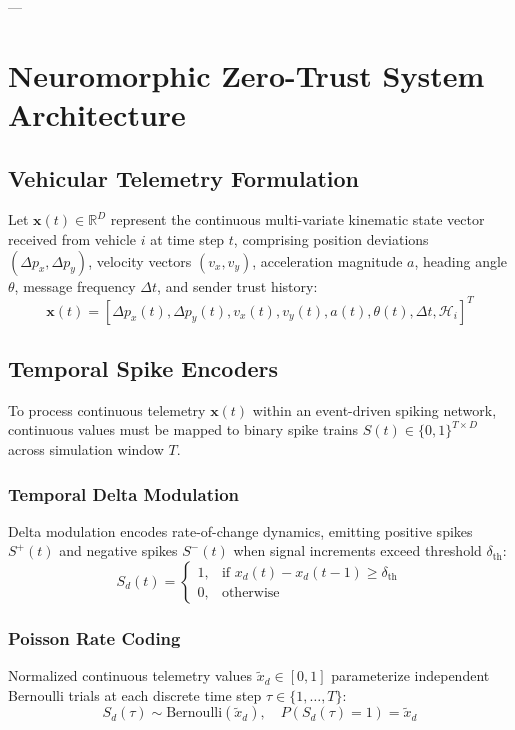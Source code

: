 \documentclass[journal,compsoc]{IEEEtran}
\begin{document}
---

\section{Neuromorphic Zero-Trust System Architecture}

\subsection{Vehicular Telemetry Formulation}
Let $\mathbf{x}(t) \in \mathbb{R}^D$ represent the continuous multi-variate kinematic state vector received from vehicle $i$ at time step $t$, comprising position deviations $(\Delta p_x, \Delta p_y)$, velocity vectors $(v_x, v_y)$, acceleration magnitude $a$, heading angle $\theta$, message frequency $\Delta t$, and sender trust history:
\begin{equation}
\mathbf{x}(t) = \left[ \Delta p_x(t), \Delta p_y(t), v_x(t), v_y(t), a(t), \theta(t), \Delta t, \mathcal{H}_i \right]^T
\end{equation}

\subsection{Temporal Spike Encoders}
To process continuous telemetry $\mathbf{x}(t)$ within an event-driven spiking network, continuous values must be mapped to binary spike trains $S(t) \in \{0, 1\}^{T \times D}$ across simulation window $T$.

\subsubsection{Temporal Delta Modulation}
Delta modulation encodes rate-of-change dynamics, emitting positive spikes $S^+(t)$ and negative spikes $S^-(t)$ when signal increments exceed threshold $\delta_{\text{th}}$:
\begin{equation}
S_d(t) = \begin{cases}
1, & \text{if } x_d(t) - x_d(t-1) \ge \delta_{\text{th}} \\
0, & \text{otherwise}
\end{cases}
\end{equation}

\subsubsection{Poisson Rate Coding}
Normalized continuous telemetry values $\tilde{x}_d \in [0, 1]$ parameterize independent Bernoulli trials at each discrete time step $\tau \in \{1, \dots, T\}$:
\begin{equation}
S_d(\tau) \sim \text{Bernoulli}(\tilde{x}_d), \quad P(S_d(\tau) = 1) = \tilde{x}_d
\end{equation}
\end{document}
